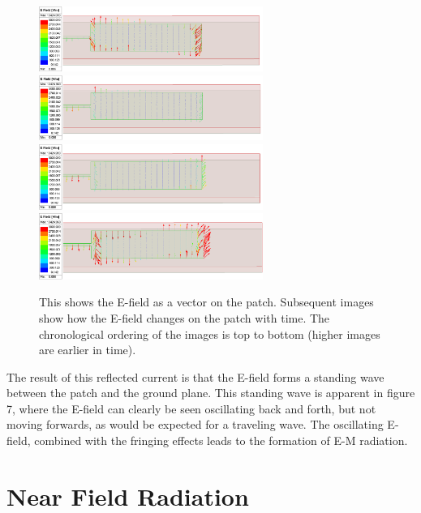 \documentclass[12pt]{article}
\begin{document}
\begin{figure}[h]
    \centering
    \includegraphics[width=0.65\textwidth]{E-field-onPatch-t0.png}
    \includegraphics[width=0.65\textwidth]{E-field-onPatch-t1.png}
    \includegraphics[width=0.65\textwidth]{E-field-onPatch-t2.png}
    \includegraphics[width=0.65\textwidth]{E-field-onPatch-t3.png}
    \caption{This shows the E-field as a vector on the patch. Subsequent images show how the E-field changes on the patch with time. The chronological ordering of the images is top to bottom (higher images are earlier in time).}
\end{figure}

The result of this reflected current is that the E-field forms a standing wave between the patch and the ground plane. This standing wave is apparent in figure 7, where the E-field can clearly be seen oscillating back and forth, but not moving forwards, as would be expected for a traveling wave. The oscillating E-field, combined with the fringing effects leads to the formation of E-M radiation.

\section{Near Field Radiation}
\end{document}
